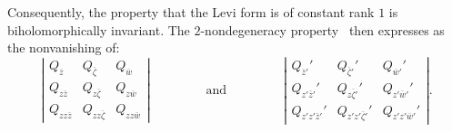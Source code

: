 \documentclass[12pt,twoside,leqno,openany]{amsart}
\begin{document}
Consequently, the property that the Levi form is of constant
rank $1$ is biholomorphically invariant.
The $2$-nondegeneracy property~{\cite{Merker-Nurowski-2020}} 
then expresses as the nonvanishing of: 
\[
\left\vert\!
\begin{array}{ccc}
Q_{\overline{z}} & Q_{\overline{\zeta}} 
& 
Q_{\overline{w}}
\\
Q_{z\overline{z}} & Q_{z\overline{\zeta}} 
& 
Q_{z\overline{w}}
\\
Q_{zz\overline{z}} & Q_{zz\overline{\zeta}} 
& 
Q_{zz\overline{w}}
\end{array}
\!\right\vert
\ \ \ \ \ \ \ \ \ \ \ \ \ \ \ \ \ \ \ \
\text{and}
\ \ \ \ \ \ \ \ \ \ \ \ \ \ \ \ \ \ \ \
\left\vert\!
\begin{array}{ccc}
Q_{\overline{z}'}' & Q_{\overline{\zeta}'}' 
& 
Q_{\overline{w}'}'
\\
Q_{z'\overline{z}'}' & Q_{z\overline{\zeta}'}'
& 
Q_{z'\overline{w}'}'
\\
Q_{z'z'\overline{z}'}' & Q_{z'z'\overline{\zeta}'}'
& 
Q_{z'z'\overline{w}'}'
\end{array}
\!\right\vert.
\]
\end{document}
